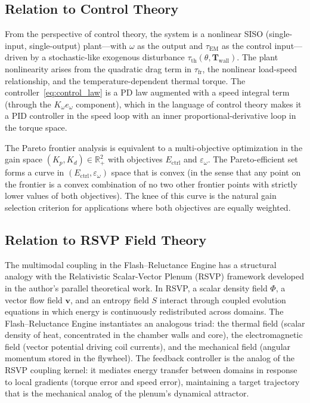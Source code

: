 \documentclass[11pt, a4paper]{article}
\theoremstyle{plain}
\theoremstyle{definition}
\newcommand{\tauEM}{\tau_{\mathrm{EM}}}
\newcommand{\tauth}{\tau_{\mathrm{th}}}
\newcommand{\taufr}{\tau_{\mathrm{fr}}}
\newcommand{\Ectrl}{E_{\mathrm{ctrl}}}
\newcommand{\om}{\omega}
\begin{document}
\subsection{Relation to Control Theory}

From the perspective of control theory, the system is a nonlinear SISO (single-input, single-output) plant---with $\om$ as the output and $\tauEM$ as the control input---driven by a stochastic-like exogenous disturbance $\tauth(\theta, \mathbf{T}_{\mathrm{wall}})$. The plant nonlinearity arises from the quadratic drag term in $\taufr$, the nonlinear load-speed relationship, and the temperature-dependent thermal torque. The controller~\eqref{eq:control_law} is a PD law augmented with a speed integral term (through the $K_\om e_\om$ component), which in the language of control theory makes it a PID controller in the speed loop with an inner proportional-derivative loop in the torque space.

The Pareto frontier analysis is equivalent to a multi-objective optimization in the gain space $(K_p, K_d) \in \mathbb{R}^2_+$ with objectives $\Ectrl$ and $\varepsilon_\om$. The Pareto-efficient set forms a curve in $(\Ectrl, \varepsilon_\om)$ space that is convex (in the sense that any point on the frontier is a convex combination of no two other frontier points with strictly lower values of both objectives). The knee of this curve is the natural gain selection criterion for applications where both objectives are equally weighted.

\subsection{Relation to RSVP Field Theory}

The multimodal coupling in the Flash--Reluctance Engine has a structural analogy with the Relativistic Scalar-Vector Plenum (RSVP) framework developed in the author's parallel theoretical work. In RSVP, a scalar density field $\Phi$, a vector flow field $\mathbf{v}$, and an entropy field $S$ interact through coupled evolution equations in which energy is continuously redistributed across domains. The Flash--Reluctance Engine instantiates an analogous triad: the thermal field (scalar density of heat, concentrated in the chamber walls and core), the electromagnetic field (vector potential driving coil currents), and the mechanical field (angular momentum stored in the flywheel). The feedback controller is the analog of the RSVP coupling kernel: it mediates energy transfer between domains in response to local gradients (torque error and speed error), maintaining a target trajectory that is the mechanical analog of the plenum's dynamical attractor.
\end{document}
